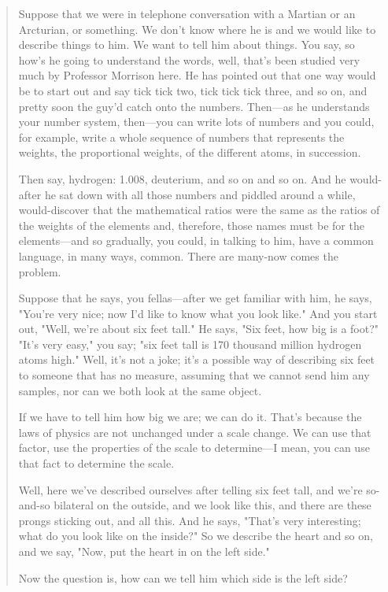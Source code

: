 \begin{quote}
Suppose that we were in telephone conversation with a Martian or an Arcturian, or something. We don’t know where he is and we would like to describe things to him. We want to tell him about things. You say, so how’s he going to understand the words, well, that’s been studied very much by Professor Morrison here. He has pointed out that one way would be to start out and say tick tick two, tick tick tick three, and so on, and pretty soon the guy’d catch onto the numbers. Then—as he understands your number system, then—you can write lots of numbers and you could, for example, write a whole sequence of numbers that represents the weights, the proportional weights, of the different atoms, in succession.

Then say, hydrogen: 1.008, deuterium, and so on and so on. And he would-after he sat down with all those numbers and piddled around a while, would-discover that the mathematical ratios were the same as the ratios of the weights of the elements and, therefore, those names must be for the elements—and so gradually, you could, in talking to him, have a common language, in many ways, common. There are many-now comes the problem.

Suppose that he says, you fellas—after we get familiar with him, he says, "You’re very nice; now I’d like to know what you look like." And you start out, "Well, we’re about six feet tall." He says, "Six feet, how big is a foot?" "It’s very easy," you say; "six feet tall is 170 thousand million hydrogen atoms high." Well, it’s not a joke; it’s a possible way of describing six feet to someone that has no measure, assuming that we cannot send him any samples, nor can we both look at the same object.

If we have to tell him how big we are; we can do it. That’s because the laws of physics are not unchanged under a scale change. We can use that factor, use the properties of the scale to determine—I mean, you can use that fact to determine the scale.

Well, here we’ve described ourselves after telling six feet tall, and we’re so-and-so bilateral on the outside, and we look like this, and there are these prongs sticking out, and all this. And he says, "That’s very interesting; what do you look like on the inside?" So we describe the heart and so on, and we say, "Now, put the heart in on the left side."

Now the question is, how can we tell him which side is the left side?
\end{quote}

